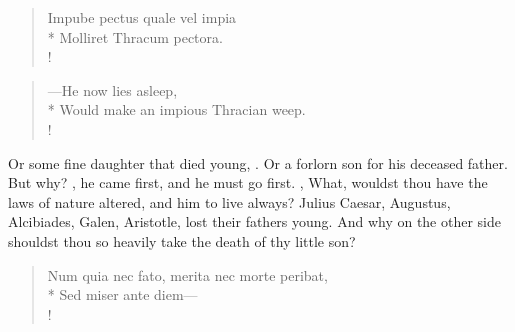 {%
\begin{latin}%
\begin{verse}%
Impube pectus quale vel impia\\*
Molliret Thracum pectora.\\!
\end{verse}%
\end{latin}%
\translationrule%
\begin{verse}%
---He now lies asleep,\\*
Would make an impious Thracian weep.\\!
\end{verse}%

Or some fine daughter that died young, . Or a forlorn son for his deceased father. But why? , he came first, and he must go first. , \etc{} What, wouldst thou have the laws of nature altered, and him to live always? Julius Caesar, Augustus, Alcibiades, Galen, Aristotle, lost their fathers young. And why on the other side shouldst thou so heavily take the death of thy little son?

\begin{latin}%
\begin{verse}%
Num quia nec fato, merita nec morte peribat,\\*
Sed miser ante diem---\\!
\end{verse}%
\end{latin}%

}
